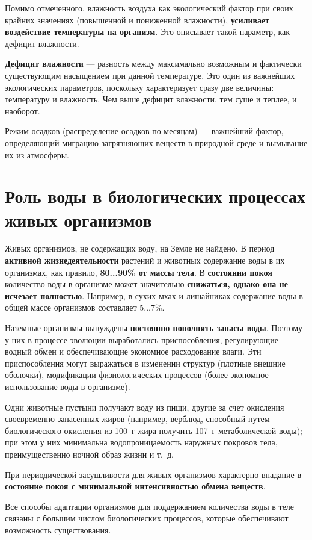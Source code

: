 \documentclass{bmstu}
\begin{document}
Помимо отмеченного, влажность воздуха как экологический фактор при своих крайних
значениях (повышенной и пониженной влажности), \textbf{усиливает воздействие
температуры на организм}. Это описывает такой параметр, как дефицит влажности.

\textbf{Дефицит влажности} --- разность между максимально возможным и фактически
существующим насыщением при данной температуре. Это один из важнейших
экологических параметров, поскольку характеризует сразу две величины:
температуру и влажность. Чем выше дефицит влажности, тем суше и теплее, и
наоборот.

Режим осадков (распределение осадков по месяцам) --- важнейший фактор,
определяющий миграцию загрязняющих веществ в природной среде и вымывание их из
атмосферы.

\section{Роль воды в биологических процессах живых организмов}

Живых организмов, не содержащих воду, на Земле не найдено. В период
\textbf{активной жизнедеятельности} растений и животных содержание воды в их
организмах, как правило, \textbf{80...90\% от массы тела}. В \textbf{состоянии
покоя} количество воды в организме может значительно \textbf{снижаться, однако
она не исчезает полностью}. Например, в сухих мхах и лишайниках содержание воды
в общей массе организмов составляет 5...7\%.

Наземные организмы вынуждены \textbf{постоянно пополнять запасы воды}. Поэтому у них в
процессе эволюции выработались приспособления, регулирующие водный обмен и
обеспечивающие экономное расходование влаги. Эти приспособления могут выражаться
в изменении структур (плотные внешние оболочки), модификации физиологических
процессов (более экономное использование воды в организме).

Одни животные пустыни получают воду из пищи, другие за счет окисления
своевременно запасенных жиров (например, верблюд, способный путем биологического
окисления из 100~г жира получить 107~г метаболической воды); при этом у них
минимальна водопроницаемость наружных покровов тела, преимущественно ночной
образ жизни и т.~д.

При периодической засушливости для живых организмов характерно впадание в
\textbf{состояние покоя с минимальной интенсивностью обмена веществ}. 

Все способы адаптации организмов для поддержанием количества воды в
теле связаны с большим числом биологических процессов, которые обеспечивают
возможность существования.
\end{document}
